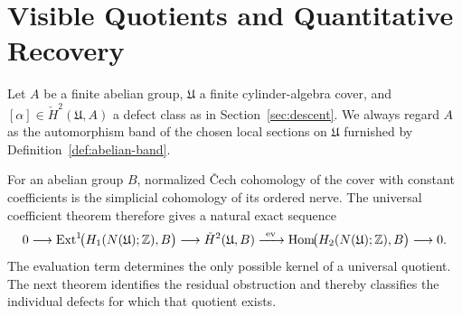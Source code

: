 \section{Visible Quotients and Quantitative Recovery}
\label{sec:visible-quotient}

Let $A$ be a finite abelian group, $\mathfrak{U}$ a finite cylinder-algebra cover, and
$[\alpha]\in\check{H}^2(\mathfrak{U},A)$ a defect class as in
Section~\ref{sec:descent}.  We always regard $A$ as the automorphism band of
the chosen local sections on $\mathfrak{U}$ furnished by
Definition~\ref{def:abelian-band}.

For an abelian group $B$, normalized \v{C}ech cohomology of the cover with
constant coefficients is the simplicial cohomology of its ordered nerve.
The universal coefficient theorem \cite[Theorem~3.2]{HatcherAlgebraicTopology}
therefore gives a natural exact sequence
\begin{equation}\label{eq:uct-visible-quotient}
0\longrightarrow
\operatorname{Ext}^1\!\bigl(H_1(N(\mathfrak{U});\mathbb{Z}),B\bigr)
\longrightarrow
\check{H}^2(\mathfrak{U},B)
\xrightarrow{\ \operatorname{ev}\ }
\operatorname{Hom}\!\bigl(H_2(N(\mathfrak{U});\mathbb{Z}),B\bigr)
\longrightarrow 0.
\end{equation}
The evaluation term determines the only possible kernel of a universal
quotient.  The next theorem identifies the residual obstruction and thereby
classifies the individual defects for which that quotient exists.

